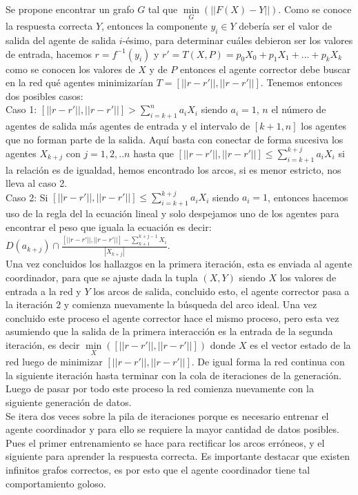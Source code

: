         Se propone encontrar un grafo $G$ tal que $\underset{G}{\min}(||F(X)-Y||)$. Como se conoce la respuesta correcta $Y$, entonces la componente $y_i \in Y$ debería ser el valor de salida del agente de salida $i$-ésimo, para determinar cuáles debieron ser los valores de entrada, hacemos $r=f^{-1}(y_i)$ y $r'=T(X,P)=p_0X_0 + p_1X_1 +...+p_kX_k$ como se conocen los valores de $X$ y de $P$
        entonces el agente corrector debe buscar en la red qué agentes minimizarían $T=[||r-r'||,||r-r'||]$. Tenemos entonces dos posibles casos: \\

        Caso 1: $[||r-r'||,||r-r'||] > \sum_{i=k+1}^{n} a_iX_i$ siendo $a_i=1$, $n$ el número de agentes de salida más agentes de entrada y el intervalo de $[k+1,n]$ los agentes
        que no forman parte de la salida. Aquí basta con conectar de forma sucesiva los agentes $X_{k+j}$ con $j=1,2,..n$ hasta que $[||r-r'||,||r-r'||] \leqslant \sum_{i=k+1}^{k+j} a_iX_i$ si la relación es de igualdad, hemos encontrado los arcos,
         si es menor estricto, nos lleva al caso 2.\\

        Caso 2: Si $[||r-r'||,||r-r'||] \leqslant \sum_{i=k+1}^{k+j} a_iX_i$ siendo $a_i=1$, entonces hacemos uso de la regla del la ecuación lineal y solo despejamos uno de los agentes para encontrar el peso que iguala la ecuación
        es decir: $D(a_{k+j}) \cap \frac{[||r-r'||,||r-r'||] - \sum_{k+1}^{k+j-1} X_i}{|X_{k+j}|}$.\\

        Una vez concluidos los hallazgos en la primera iteración, esta es enviada al agente coordinador, para que se ajuste dada la tupla $(X,Y)$ siendo
        $X$ los valores de entrada a la red y $Y$ los arcos de salida, concluido esto, el agente corrector pasa a la iteración 2 y comienza nuevamente la búsqueda del arco ideal. Una vez concluido este proceso
        el agente corrector hace el mismo proceso, pero esta vez asumiendo que la salida de la primera interacción es la entrada de la segunda iteración, es decir $\underset{X}{\min}([||r-r'||,||r-r'||])$ donde $X$ es el vector estado de la red luego de minimizar $[||r-r'||,||r-r'||]$.
        De igual forma la red continua con la siguiente iteración hasta terminar con la cola de iteraciones de la generación. Luego de pasar por todo este proceso la red comienza nuevamente con la siguiente generación de datos. \\

        Se itera dos veces sobre la pila de iteraciones porque es necesario entrenar el agente coordinador y para ello se requiere la mayor cantidad de datos posibles. Pues el primer entrenamiento se hace para rectificar los arcos erróneos, y el siguiente para aprender la respuesta correcta.
        Es importante destacar que existen infinitos grafos correctos, es por esto que el agente coordinador tiene tal comportamiento goloso.

